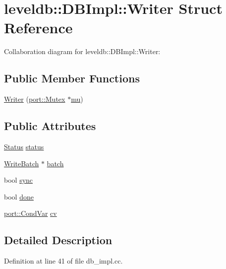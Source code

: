 \hypertarget{structleveldb_1_1_d_b_impl_1_1_writer}{}\section{leveldb\+:\+:D\+B\+Impl\+:\+:Writer Struct Reference}
\label{structleveldb_1_1_d_b_impl_1_1_writer}


Collaboration diagram for leveldb\+:\+:D\+B\+Impl\+:\+:Writer\+:
\subsection*{Public Member Functions}
\begin{DoxyCompactItemize}
\item 
\hyperlink{structleveldb_1_1_d_b_impl_1_1_writer_a7dfb43a804e1ded7a2a85b3bc756ea93}{Writer} (\hyperlink{classleveldb_1_1port_1_1_mutex}{port\+::\+Mutex} $\ast$\hyperlink{db__impl_8cc_a900dad9ea326bf70a183d88a8ab50a13}{mu})
\end{DoxyCompactItemize}
\subsection*{Public Attributes}
\begin{DoxyCompactItemize}
\item 
\hyperlink{classleveldb_1_1_status}{Status} \hyperlink{structleveldb_1_1_d_b_impl_1_1_writer_af3b0436a99d2679c0e0ac9f6e1fefa37}{status}
\item 
\hyperlink{classleveldb_1_1_write_batch}{Write\+Batch} $\ast$ \hyperlink{structleveldb_1_1_d_b_impl_1_1_writer_ada051134318411635892f0a7d17cb7c0}{batch}
\item 
bool \hyperlink{structleveldb_1_1_d_b_impl_1_1_writer_acb39717e1fa61127f262b474e18ec9f6}{sync}
\item 
bool \hyperlink{structleveldb_1_1_d_b_impl_1_1_writer_afc6025afd873f82252cb563687bd3106}{done}
\item 
\hyperlink{classleveldb_1_1port_1_1_cond_var}{port\+::\+Cond\+Var} \hyperlink{structleveldb_1_1_d_b_impl_1_1_writer_aacb835eedc44855a7c223fca024c5ac4}{cv}
\end{DoxyCompactItemize}


\subsection{Detailed Description}


Definition at line 41 of file db\+\_\+impl.\+cc.



